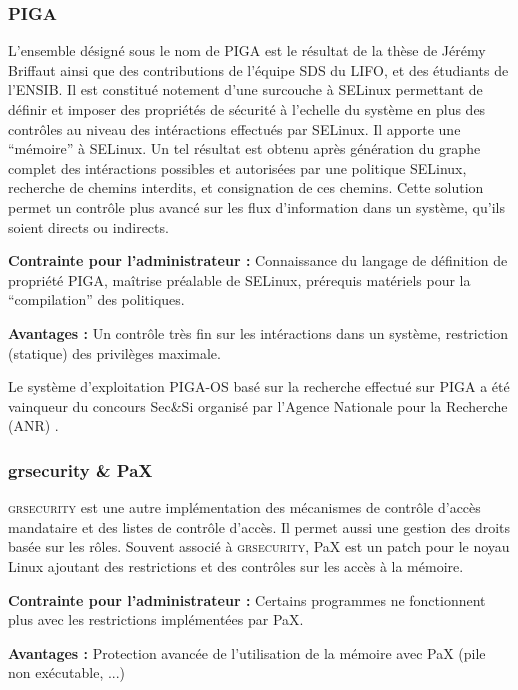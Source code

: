 \subsubsection{PIGA}

L'ensemble désigné sous le nom de PIGA est le résultat de la thèse de Jérémy Briffaut ainsi que des contributions de l'équipe SDS du LIFO, et des étudiants de l'ENSIB. Il est constitué notement d'une surcouche à SELinux permettant de définir et imposer des propriétés de sécurité à l'echelle du système en plus des contrôles au niveau des intéractions effectués par SELinux. Il apporte une ``mémoire'' à SELinux. Un tel résultat est obtenu après génération du graphe complet des intéractions possibles et autorisées par une politique SELinux, recherche de chemins interdits, et consignation de ces chemins. Cette solution permet un contrôle plus avancé sur les flux d'information dans un système, qu'ils soient directs ou indirects.

\begin{list}{}{}
 \item \textbf{Contrainte pour l'administrateur :} Connaissance du langage de définition de propriété PIGA, maîtrise préalable de SELinux, prérequis matériels pour la ``compilation'' des politiques.
 \item \textbf{Avantages :} Un contrôle très fin sur les intéractions dans un système, restriction (statique) des privilèges maximale.
\end{list}

Le système d'exploitation PIGA-OS basé sur la recherche effectué sur PIGA a été vainqueur du concours Sec\&Si organisé par l'Agence Nationale pour la Recherche (ANR) \cite{PIGA}\cite{PIGA2}.

\subsubsection{grsecurity \& PaX}

\textsc{grsecurity} est une autre implémentation des mécanismes de contrôle d'accès mandataire et des listes de contrôle d'accès. Il permet aussi une gestion des droits basée sur les rôles. Souvent associé à \textsc{grsecurity}, PaX est un patch pour le noyau Linux ajoutant des restrictions et des contrôles sur les accès à la mémoire.

\begin{list}{}{}
 \item \textbf{Contrainte pour l'administrateur :} Certains programmes ne fonctionnent plus avec les restrictions implémentées par PaX.
 \item \textbf{Avantages :} Protection avancée de l'utilisation de la mémoire avec PaX (pile non exécutable, ...)
\end{list}

